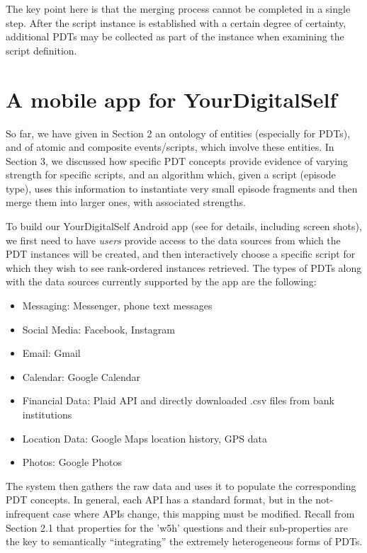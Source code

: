 \documentclass[11pt]{article}
\begin{document}
The key point here is that the merging process cannot be completed in a single step. After the script instance is established with a certain degree of certainty, additional PDTs may be collected as part of the instance when examining the script definition.

\section{A mobile app for YourDigitalSelf}

So far, we have given in Section 2 an ontology of entities (especially for
PDTs), and of atomic and composite events/scripts, which
involve these entities. In Section 3, we discussed how specific PDT concepts
provide evidence of varying strength for specific scripts,
and an algorithm which, given a script (episode type), uses this information to
instantiate very small episode fragments and then merge them into
larger ones, with associated strengths.

To build our YourDigitalSelf Android app (see
\cite{kalokyri2018yourdigitalself} for details, including screen shots), we first
need to have {\em users} provide access to the data sources from
which the PDT instances will be created, and then interactively choose
a specific script for which they wish to see rank-ordered instances
retrieved. 
The types of PDTs along with the data sources currently supported by the app are the following:
 \begin{itemize}[noitemsep, topsep=1pt]
     \item {Messaging: Messenger, phone text messages}
     \item {Social Media: Facebook, Instagram}
     \item {Email: Gmail}
     \item {Calendar: Google Calendar}
     \item {Financial Data: Plaid API and directly downloaded .csv files from bank institutions}
     \item {Location Data: Google Maps location history, GPS data}
     \item {Photos: Google Photos}
 \end{itemize}
The system then gathers the raw data and uses it to populate the
corresponding PDT concepts.  In
general, each API has a standard format, but in the
not-infrequent case where APIs change, this mapping must be modified.
Recall from Section 2.1 that properties for the 'w5h' questions and their
sub-properties are the key to semantically ``integrating'' the extremely heterogeneous forms of PDTs.
\end{document}
